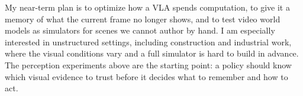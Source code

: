 \documentclass[11pt]{article}
\begin{document}
My near-term plan is to optimize how a VLA spends computation, to give it a memory of what the current frame no longer shows, and to test video world models as simulators for scenes we cannot author by hand. I am especially interested in unstructured settings, including construction and industrial work, where the visual conditions vary and a full simulator is hard to build in advance. The perception experiments above are the starting point: a policy should know which visual evidence to trust before it decides what to remember and how to act.

\end{document}
